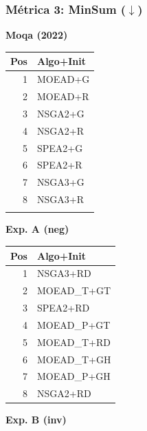 \documentclass[a4paper,10pt]{article}
\begin{document}
\subsubsection{Métrica 3: MinSum \texorpdfstring{($\downarrow$)}{(down)}}
\begin{table}[H]
    \centering
    \begin{minipage}[t]{0.32\textwidth}
        \centering\scriptsize\textbf{Moqa (2022)}\\
        \begin{tabular}{rl}
            \toprule
            Pos & Algo+Init \\ \midrule
            1 & MOEAD+G \\
            2 & MOEAD+R \\
            3 & NSGA2+G \\
            4 & NSGA2+R \\
            5 & SPEA2+G \\
            6 & SPEA2+R \\
            7 & NSGA3+G \\
            8 & NSGA3+R \\
            \\
            \bottomrule
        \end{tabular}
    \end{minipage}
    \hfill
    \begin{minipage}[t]{0.32\textwidth}
        \centering\scriptsize\textbf{Exp. A (neg)}\\
        \begin{tabular}{rl}
            \toprule
            Pos & Algo+Init \\ \midrule
            1 & NSGA3+RD \\
            2 & MOEAD\_T+GT \\
            3 & SPEA2+RD \\
            4 & MOEAD\_P+GT \\
            5 & MOEAD\_T+RD \\
            6 & MOEAD\_T+GH \\
            7 & MOEAD\_P+GH \\
            8 & NSGA2+RD \\
            \bottomrule
        \end{tabular}
    \end{minipage}
    \hfill
    \begin{minipage}[t]{0.32\textwidth}
        \centering\scriptsize\textbf{Exp. B (inv)}\\

\end{minipage}
\end{table}
\end{document}
